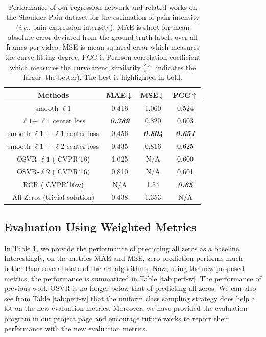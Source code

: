 \documentclass{article}
\begin{document}
\begin{table}[!t]
{\small
\begin{center}
\begin{tabular}{|c|c|c|c|}
\hline
Methods & MAE$\downarrow$ & MSE$\downarrow$ & PCC$\uparrow$ \\
\hline
\hline
smooth $\ell 1$ & 0.416 & 1.060 & 0.524 \\
\hline
$\ell 1$+ $\ell 1$ center loss & {\bf \emph{0.389}} & 0.820 & 0.603 \\
\hline
smooth $\ell 1$ + $\ell 1$ center loss & 0.456 & {\bf \emph{0.804}} & {\bf \emph{0.651}} \\ 
\hline
smooth $\ell 1$ +  $\ell 2$ center loss & 0.435 & 0.816 & 0.625 \\
\hline
\hline
OSVR-$\ell 1$ (\cite{Zhao_2016_CVPR} CVPR'16)  & 1.025 & N/A & 0.600 \\
\hline
OSVR-$\ell 2$ (\cite{Zhao_2016_CVPR} CVPR'16)  & 0.810 & N/A & 0.601 \\
\hline
RCR (\cite{zhou2016recurrent} CVPR'16w)  & N/A & 1.54 & {\bf \emph{0.65}} \\
\hline
\hline
All Zeros (trivial solution) & 0.438 & 1.353 & N/A \\
\hline
\end{tabular}
\end{center}
\vspace{-2mm}
\caption{Performance of our regression network and related works on the Shoulder-Pain dataset 
for the estimation of pain intensity (\emph{i.e.}, pain expression intensity).
MAE is short for mean absolute error deviated from the ground-truth labels over all frames per video.
MSE is mean squared error which measures the curve fitting degree. 
PCC is Pearson correlation coefficient which measures the curve trend similarity ($\uparrow$ indicates the larger, the better).
The best is highlighted in bold.}
\label{tab:perf}
}
\end{table}

\subsection{Evaluation Using Weighted Metrics}\label{sec:imb}
\vspace{-2mm}
In Table \ref{tab:perf}, we provide the performance of predicting all zeros as a baseline. 
Interestingly, on the metrics MAE and MSE, zero prediction performs much better than several state-of-the-art algorithms. 
Now, using the new proposed metrics, the performance is summarized in Table \ref{tab:perf-w}. 
The performance of previous work OSVR \cite{Zhao_2016_CVPR} is no longer below that of predicting all zeros. 
We can also see from Table \ref{tab:perf-w} that the uniform class sampling strategy does help a lot on the new evaluation metrics. Moreover, we have provided the evaluation program in our project page and encourage future works to report their performance with the new evaluation metrics.
\end{document}
